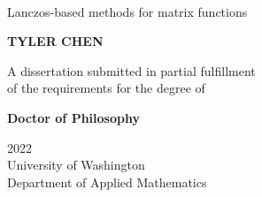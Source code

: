 \documentclass[11pt]{report}
\theoremstyle{definition}
\begin{document}
\fontsize{11}{16}\selectfont

\pagestyle{empty}



\begin{titlepage}
\renewcommand{\thepage}{Title page}
~\vfill~
\sffamily

\fontsize{19.2}{22}\selectfont
Lanczos-based  methods for matrix functions

\vspace{1.5cm}
\fontsize{26}{22}\selectfont
\textbf{TYLER CHEN}

\vspace{5cm}

\fontsize{10}{12}\selectfont
A dissertation submitted in partial fulfillment 
\\
of the requirements for the degree of

\textbf{Doctor of Philosophy}

\vspace{3cm}
2022
\\
University of Washington
\\
Department of Applied Mathematics

\end{titlepage}


\pagestyle{front}






{
\fontsize{11}{13}\selectfont
\tableofcontents
}

\clearpage
{}
\pagestyle{body}

 



 

 













\printbibliography[heading=bibnumbered]
\end{document}
